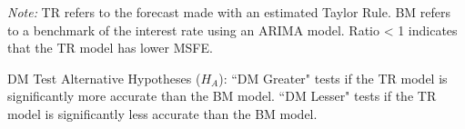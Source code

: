 \begin{table}
{\begin{threeparttable}
\begin{tabular}[t]{>{}r|rrr>{}l>{}l>{}l}
\bottomrule
\end{tabular}
\begin{tablenotes}[para]
\item \textit{Note:} TR refers to the forecast made with an estimated Taylor Rule. BM refers to a benchmark of the interest rate using an ARIMA model. Ratio < 1 indicates that the TR model has lower MSFE. \\
\item DM Test Alternative Hypotheses ($H_A$): ``DM Greater" tests if the TR model is significantly more accurate than the BM model. ``DM Lesser" tests if the TR model is significantly less accurate than the BM model.
\end{tablenotes}
\end{threeparttable}}
\end{table}
